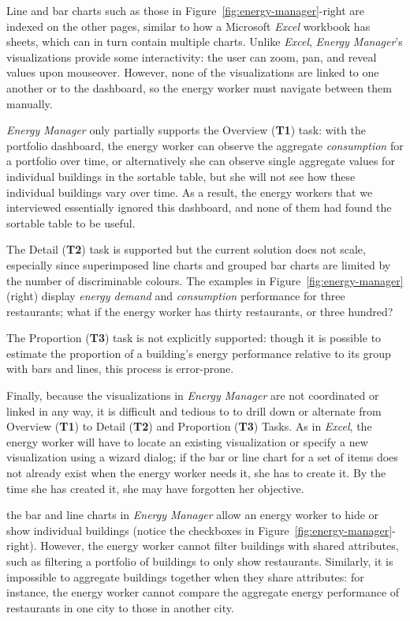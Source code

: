\documentclass[journal]{vgtc}                %
\newcommand{\bstart}[1]{\vspace{1mm} \noindent{\textbf{#1:}}}
\newcommand{\tm}[1]{\textcolor{red}{#1}}
\begin{document}
Line and bar charts such as those in Figure~\ref{fig:energy-manager}-right are indexed on the other pages, similar to how a Microsoft {\it Excel} workbook has sheets, which can in turn contain multiple charts. 
Unlike {\it Excel}, {\it Energy Manager}'s visualizations provide some interactivity: the user can zoom, pan, and reveal values upon mouseover. 
However, none of the visualizations are linked to one another or to the dashboard, so the energy worker must navigate between them manually.

\bstart{Task support} {\it Energy Manager} only partially supports the Overview ({\bf T1}) task: with the portfolio dashboard, the energy worker can observe the aggregate {\it consumption} for a portfolio over time, or alternatively she can observe single aggregate values for individual buildings in the sortable table, but she will not see how these individual buildings vary over time.
As a result, the energy workers that we interviewed essentially ignored this dashboard, and none of them had found the sortable table to be useful. 

The Detail ({\bf T2}) task is supported but the current solution does not scale, especially since superimposed line charts and grouped bar charts are limited by the number of discriminable colours.
The examples in Figure~\ref{fig:energy-manager} (right) display {\it energy demand} and {\it consumption} performance for three restaurants; what if the energy worker has thirty restaurants, or three hundred?

The Proportion ({\bf T3}) task is not explicitly supported: though it is possible to estimate the proportion of a building's energy performance relative to its group with bars and lines, this process is error-prone.

Finally, because the visualizations in {\it Energy Manager} are not coordinated or linked in any way, it is difficult and tedious to to drill down or alternate from Overview ({\bf T1}) to Detail ({\bf T2}) and Proportion ({\bf T3}) Tasks. 
As in {\it Excel}, the energy worker will have to locate an existing visualization or specify a new visualization using a wizard dialog; if the bar or line chart for a set of items does not already exist when the energy worker needs it, she has to create it. 
By the time she has created it, she may have forgotten her objective.

\bstart{Limited filtering and aggregation} the bar and line charts in {\it Energy Manager} allow an energy worker to hide or show individual buildings (notice the checkboxes in Figure~\ref{fig:energy-manager}-right).
However, the energy worker cannot filter buildings with shared attributes, such as filtering a portfolio of buildings to only show restaurants.
Similarly, it is impossible to aggregate buildings together when they share attributes: for instance, the energy worker cannot compare the aggregate energy performance of restaurants in one city to those in another city.
\end{document}
